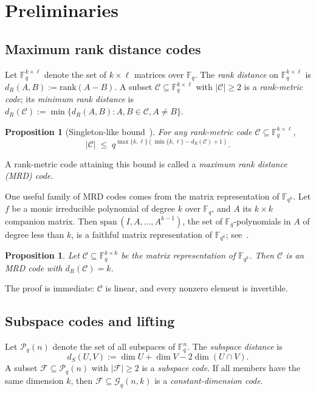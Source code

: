 \documentclass[11pt]{article}
\newtheorem{proposition}[theorem]{Proposition}
\theoremstyle{definition}
\newcommand{\F}{\mathbb{F}}
\newcommand{\spn}{\mathrm{span}\,}
\begin{document}
\section{Preliminaries}

\subsection{Maximum rank distance codes}

Let $\F_q^{k \times \ell}$ denote the set of $k \times \ell$ matrices over $\F_q$. The \emph{rank distance} on $\F_q^{k \times \ell}$ is $d_R(A, B) := \mathrm{rank}(A - B)$. A subset $\mathcal{C} \subseteq \F_q^{k \times \ell}$ with $|\mathcal{C}| \geq 2$ is a \emph{rank-metric code}; its \emph{minimum rank distance} is $d_R(\mathcal{C}) := \min\{d_R(A,B) : A, B \in \mathcal{C}, A \neq B\}$.

\begin{proposition}[Singleton-like bound~\cite{delsarte}]
For any rank-metric code $\mathcal{C} \subseteq \F_q^{k \times \ell}$,
\[
|\mathcal{C}| \;\leq\; q^{\max\{k, \ell\}(\min\{k, \ell\} - d_R(\mathcal{C}) + 1)}.
\]
\end{proposition}

A rank-metric code attaining this bound is called a \emph{maximum rank distance (MRD) code}.

One useful family of MRD codes comes from the matrix representation of $\F_{q^k}$. Let $f$ be a monic irreducible polynomial of degree $k$ over $\F_q$, and $A$ its $k \times k$ companion matrix. Then $\spn(I, A, \ldots, A^{k-1})$, the set of $\F_q$-polynomials in $A$ of degree less than $k$, is a faithful matrix representation of $\F_{q^k}$; see~\cite[\S2.5]{lidl}.

\begin{proposition}\label{prop:matrix-rep}
Let $\mathcal{C} \subseteq \F_q^{k \times k}$ be the matrix representation of $\F_{q^k}$. Then $\mathcal{C}$ is an MRD code with $d_R(\mathcal{C}) = k$.
\end{proposition}

The proof is immediate: $\mathcal{C}$ is linear, and every nonzero element is invertible.

\subsection{Subspace codes and lifting}

Let $\mathcal{P}_q(n)$ denote the set of all subspaces of $\F_q^n$. The \emph{subspace distance} is
\[
d_S(U, V) := \dim U + \dim V - 2 \dim(U \cap V).
\]
A subset $\mathcal{F} \subseteq \mathcal{P}_q(n)$ with $|\mathcal{F}| \geq 2$ is a \emph{subspace code}. If all members have the same dimension $k$, then $\mathcal{F} \subseteq \mathcal{G}_q(n, k)$ is a \emph{constant-dimension code}.
\end{document}
